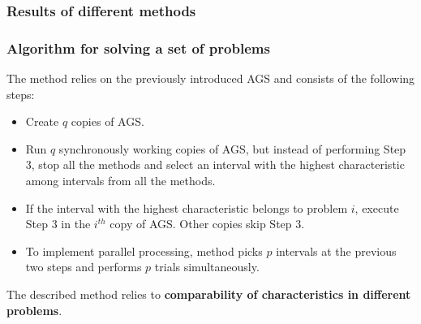 \documentclass[aspectratio=1610]{beamer}
\begin{document}
\begin{frame}
  \frametitle{Results of different methods}
  \begin{figure}[ht]
    \centering
  \end{figure}
\end{frame}


\begin{frame}
  \frametitle{Algorithm for solving a set of problems}
  The method relies on the previously introduced AGS and consists of the following steps:
  \begin{itemize}
    \item Create \(q\) copies of AGS.
    \item Run \(q\) synchronously working copies of AGS, but instead of performing Step 3, stop all
    the methods and select an interval with the highest characteristic among intervals from all the methods.
    \item If the interval with the highest characteristic belongs to problem \(i\), execute Step 3 in the \(i^{th}\) copy of AGS.
    Other copies skip Step 3.
    \item To implement parallel processing, method picks \(p\) intervals at the previous two steps
    and performs \(p\) trials simultaneously.
  \end{itemize}
  The described method relies to \textbf{comparability of characteristics in different problems}.
\end{frame}
\end{document}
